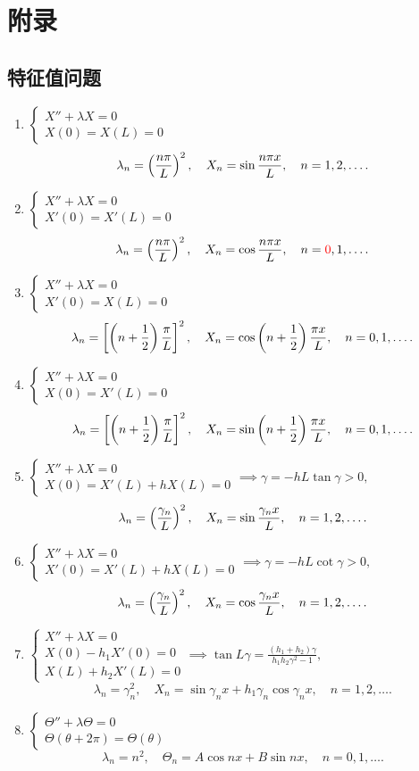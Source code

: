 \chapter{附录}
\section{特征值问题}
\begin{enumerate}
	\item $\begin{cases}
		X''+\lambda X=0\\
		X(0)=X(L)=0
	\end{cases}$
	\[\lambda_n=\left(\frac{n\pi}L\right)^2,\quad X_n=\sin\frac{n\pi x}L,\quad n=1,2,\ldots.\]
	\item $\begin{cases}
		X''+\lambda X=0\\
		X'(0)=X'(L)=0
	\end{cases}$
	\[\lambda_n=\left(\frac{n\pi}L\right)^2,\quad X_n=\cos\frac{n\pi x}L,\quad n={\color{red}0},1,\ldots.\]
	\item $\begin{cases}
		X''+\lambda X=0\\
		X'(0)=X(L)=0
	\end{cases}$
	\[\lambda_n=\left[\left(n+\frac12\right)\frac{\pi}L\right]^2,\quad X_n=\cos\left(n+\frac12\right)\frac{\pi x}L,\quad n=0,1,\ldots.\]
	\item $\begin{cases}
		X''+\lambda X=0\\
		X(0)=X'(L)=0
	\end{cases}$
	\[\lambda_n=\left[\left(n+\frac12\right)\frac{\pi}L\right]^2,\quad X_n=\sin\left(n+\frac12\right)\frac{\pi x}L,\quad n=0,1,\ldots.\]
	\item $\begin{cases}
		X''+\lambda X=0\\
		X(0)=X'(L)+hX(L)=0
	\end{cases}\implies \gamma=-hL\tan\gamma>0,$
	\[\lambda_n=\left(\frac{\gamma_n}L\right)^2,\quad X_n=\sin\frac{\gamma_n x}L,\quad n=1,2,\ldots.\]
	\item $\begin{cases}
		X''+\lambda X=0\\
		X'(0)=X'(L)+hX(L)=0
	\end{cases}\implies \gamma=-hL\cot\gamma>0,$
	\[\lambda_n=\left(\frac{\gamma_n}L\right)^2,\quad X_n=\cos\frac{\gamma_n x}L,\quad n=1,2,\ldots.\]
	\item $\begin{cases}
		X''+\lambda X=0\\
		X(0)-h_1X'(0)=0\\
		X(L)+h_2X'(L)=0
	\end{cases}\implies\tan L\gamma=\frac{(h_1+h_2)\gamma}{h_1h_2\gamma^2-1},$
	\[\lambda_n=\gamma_n^2,\quad X_n=\sin\gamma_n x+h_1\gamma_n\cos\gamma_nx,\quad n=1,2,\ldots.\]
	\item $\begin{cases}
		\varTheta''+\lambda\varTheta=0\\
		\varTheta(\theta+2\pi)=\varTheta(\theta)
	\end{cases}$
	\[\lambda_n=n^2,\quad\varTheta_n=A\cos nx+B\sin nx,\quad n=0,1,\ldots.\]
\end{enumerate}

